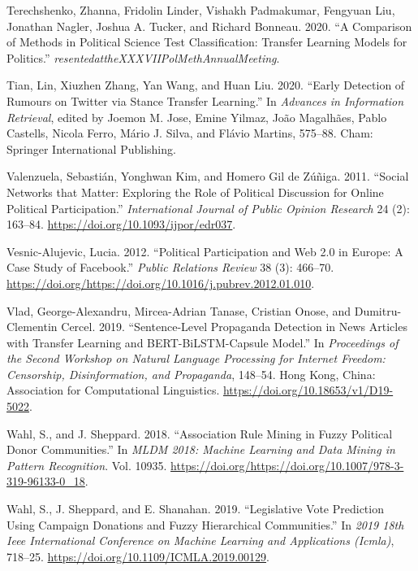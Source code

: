 \documentclass[12pt,]{article}
\begin{document}
\leavevmode\hypertarget{ref-terechshenko2020}{}%
Terechshenko, Zhanna, Fridolin Linder, Vishakh Padmakumar, Fengyuan Liu,
Jonathan Nagler, Joshua A. Tucker, and Richard Bonneau. 2020. ``A
Comparison of Methods in Political Science Test Classification: Transfer
Learning Models for Politics.''
\emph{resentedattheXXXVIIPolMethAnnualMeeting}.

\leavevmode\hypertarget{ref-tian2020}{}%
Tian, Lin, Xiuzhen Zhang, Yan Wang, and Huan Liu. 2020. ``Early
Detection of Rumours on Twitter via Stance Transfer Learning.'' In
\emph{Advances in Information Retrieval}, edited by Joemon M. Jose,
Emine Yilmaz, João Magalhães, Pablo Castells, Nicola Ferro, Mário J.
Silva, and Flávio Martins, 575--88. Cham: Springer International
Publishing.

\leavevmode\hypertarget{ref-valenzuela2011}{}%
Valenzuela, Sebastián, Yonghwan Kim, and Homero Gil de Zúñiga. 2011.
``Social Networks that Matter: Exploring the Role of Political
Discussion for Online Political Participation.'' \emph{International
Journal of Public Opinion Research} 24 (2): 163--84.
\url{https://doi.org/10.1093/ijpor/edr037}.

\leavevmode\hypertarget{ref-vesnic2012}{}%
Vesnic-Alujevic, Lucia. 2012. ``Political Participation and Web 2.0 in
Europe: A Case Study of Facebook.'' \emph{Public Relations Review} 38
(3): 466--70.
\url{https://doi.org/https://doi.org/10.1016/j.pubrev.2012.01.010}.

\leavevmode\hypertarget{ref-vlad2019}{}%
Vlad, George-Alexandru, Mircea-Adrian Tanase, Cristian Onose, and
Dumitru-Clementin Cercel. 2019. ``Sentence-Level Propaganda Detection in
News Articles with Transfer Learning and BERT-BiLSTM-Capsule Model.'' In
\emph{Proceedings of the Second Workshop on Natural Language Processing
for Internet Freedom: Censorship, Disinformation, and Propaganda},
148--54. Hong Kong, China: Association for Computational Linguistics.
\url{https://doi.org/10.18653/v1/D19-5022}.

\leavevmode\hypertarget{ref-wahl2018}{}%
Wahl, S., and J. Sheppard. 2018. ``Association Rule Mining in Fuzzy
Political Donor Communities.'' In \emph{MLDM 2018: Machine Learning and
Data Mining in Pattern Recognition}. Vol. 10935.
\url{https://doi.org/https://doi.org/10.1007/978-3-319-96133-0_18}.

\leavevmode\hypertarget{ref-wahl2019}{}%
Wahl, S., J. Sheppard, and E. Shanahan. 2019. ``Legislative Vote
Prediction Using Campaign Donations and Fuzzy Hierarchical
Communities.'' In \emph{2019 18th Ieee International Conference on
Machine Learning and Applications (Icmla)}, 718--25.
\url{https://doi.org/10.1109/ICMLA.2019.00129}.
\end{document}

